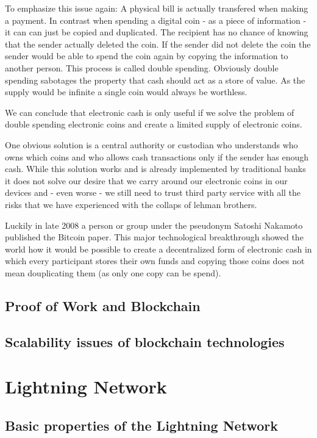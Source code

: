 \documentclass[ebook,12pt,oneside,openany]{memoir}
\begin{document}
To emphasize this issue again: A physical bill is actually transfered when making a payment. In contrast when spending a digital coin - as a piece of information - it can can just be copied and duplicated.
The recipient has no chance of knowing that the sender actually deleted the coin.
If the sender did not delete the coin the sender would be able to spend the coin again by copying the information to another person.
This process is called double spending.
Obviously double spending sabotages the property that cash should act as a store of value. As the supply would be infinite a single coin would always be worthless. 

We can conclude that electronic cash is only useful if we solve the problem of double spending electronic coins and create a limited supply of electronic coins.

One obvious solution is a central authority or custodian who understands who owns which coins and who allows cash transactions only if the sender has enough cash.
While this solution works and is already implemented by traditional banks it does not solve our desire that we carry around our electronic coins in our devices and - even worse - we still need to trust third party service with all the risks that we have experienced with the collaps of lehman brothers.

Luckily in late 2008 a person or group under the pseudonym Satoshi Nakamoto published the Bitcoin paper.
This major technological breakthrough showed the world how it would be possible to create a decentralized form of electronic cash in which every participant stores their own funds and copying those coins does not mean douplicating them (as only one copy can be spend).

\section{Proof of Work and Blockchain}
\section{Scalability issues of blockchain technologies}
\chapter{Lightning Network}
\section{Basic properties of the Lightning Network}
\end{document}
